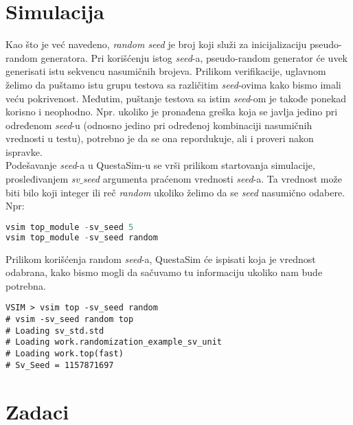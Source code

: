 
\section{Simulacija}

Kao što je već navedeno, \emph{random seed} je broj koji služi za
inicijalizaciju pseudo-random generatora. Pri korišćenju istog \emph{seed}-a,
pseudo-random generator će uvek generisati istu sekvencu nasumičnih brojeva.
Prilikom verifikacije, uglavnom želimo da puštamo istu grupu testova sa
različitim \emph{seed}-ovima kako bismo imali veću pokrivenost. Međutim,
puštanje testova sa istim \emph{seed}-om je takođe ponekad korisno i neophodno.
Npr. ukoliko je pronađena greška koja se javlja jedino pri određenom
\emph{seed}-u (odnosno jedino pri određenoj kombinaciji nasumičnih vrednosti u
testu), potrebno je da se ona repordukuje, ali i proveri nakon ispravke.\\

Podešavanje \emph{seed}-a u QuestaSim-u se vrši prilikom startovanja simulacije,
prosleđivanjem \emph{sv\(\_\)seed} argumenta praćenom vrednosti \emph{seed}-a.
Ta vrednost može biti bilo koji integer ili reč \emph{random} ukoliko želimo da
se \emph{seed} nasumično odabere. Npr:

\begin{lstlisting}[language=Python]
vsim top_module -sv_seed 5
vsim top_module -sv_seed random
\end{lstlisting}

Prilikom korišćenja random \emph{seed}-a, QuestaSim će ispisati koja je vrednost
odabrana, kako bismo mogli da sačuvamo tu informaciju ukoliko nam bude potrebna.

\begin{verbatim}
VSIM > vsim top -sv_seed random
# vsim -sv_seed random top
# Loading sv_std.std
# Loading work.randomization_example_sv_unit
# Loading work.top(fast)
# Sv_Seed = 1157871697
\end{verbatim}


\section{Zadaci}

